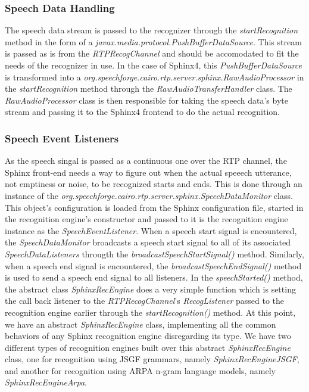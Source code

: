 \subsubsection{Speech Data Handling}
The speech data stream is passed to the recognizer through the \textit{startRecognition} method in the form of a \textit{javax.media.protocol.PushBufferDataSource}.
This stream is passed as is from the \textit{RTPRecogChannel} and should be accomodated to fit the needs of the recognizer in use.
In the case of Sphinx4, this \textit{PushBufferDataSource} is transformed into a \textit{org.speechforge.cairo.rtp.server.sphinx.RawAudioProcessor} in the \textit{startRecognition} method through the \textit{RawAudioTransferHandler} class.
The \textit{RawAudioProcessor} class is then responsible for taking the speech data's byte stream and passing it to the Sphinx4 frontend to do the actual recognition.


\subsubsection{Speech Event Listeners}
As the speech singal is passed as a continuous one over the RTP channel, the Sphinx front-end needs a way to figure out when the actual speeech utterance, not emptiness or noise, to be recognized starts and ends.
This is done through an instance of the \textit{org.speechforge.cairo.rtp.server.sphinx.SpeechDataMonitor} class.
This object's configuration is loaded from the Sphinx configuration file, started in the recognition engine's constructor and passed to it is the recognition engine instance as the \textit{SpeechEventListener}.
When a speech start signal is encountered, the \textit{SpeechDataMonitor} broadcasts a speech start signal to all of its associated \textit{SpeechDataListeners} througth the \textit{broadcastSpeechStartSignal()} method. 
Similarly, when a speech end signal is encountered, the \textit{broadcastSpeechEndSignal()} method is used to send a speech end signal to all listeners.
In the \textit{speechStarted()} method, the abstract class \textit{SphinxRecEngine} does a very simple function which is setting the call back listener to the \textit{RTPRecogChannel}'s \textit{RecogListener} passed to the recognition engine earlier through the \textit{startRecognition()} method.
At this point, we have an abstract \textit{SphinxRecEngine} class, implementing all the common behaviors of any Sphinx recognition engine disregarding its type.
We have two different types of recognition engines built over this abstract \textit{SphinxRecEngine} class, one for recognition using JSGF grammars, namely \textit{SphinxRecEngineJSGF}, and another for recognition using ARPA n-gram language models, namely \textit{SphinxRecEngineArpa}.

